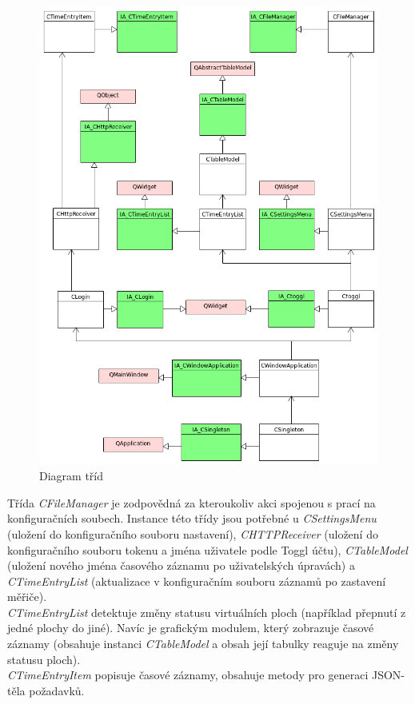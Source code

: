 \documentclass[thesis=B,czech]{FITthesis}[2012/06/26]
\begin{document}
 \begin{figure}\centering
	\includegraphics[width=1\textwidth]{class_model.png}
	\caption[Diagram tříd]{Diagram tříd}\label{fig:class_model}
\end{figure}
Třída \textit{CFileManager} je zodpovědná za kteroukoliv akci spojenou s prací na konfiguračních soubech. Instance této třídy jsou potřebné u \textit{CSettingsMenu} (uložení do konfiguračního souboru nastavení), \textit{CHTTPReceiver} (uložení do konfiguračního souboru tokenu a jména uživatele podle Toggl účtu), \textit{CTableModel} (uložení nového jména časového záznamu po uživatelských úpravách) a \textit{CTimeEntryList} (aktualizace v konfiguračním souboru záznamů po zastavení měřiče).\\
\textit{CTimeEntryList} detektuje změny statusu virtuálních ploch (například přepnutí z jedné plochy do jiné). Navíc je grafickým modulem, který zobrazuje časové záznamy (obsahuje instanci \textit{CTableModel} a obsah její tabulky reaguje na změny statusu ploch).\\
\textit{CTimeEntryItem} popisuje časové záznamy, obsahuje metody pro generaci JSON-těla požadavků. 
\end{document}
